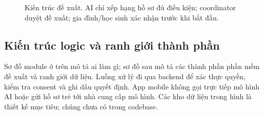 \documentclass[11pt,a4paper]{article}
\begin{document}
\begin{figure}[ht]
{%
}
\caption{Kiến trúc đề xuất. AI chỉ xếp hạng hồ sơ đủ điều kiện; coordinator
duyệt đề xuất; gia đình/học sinh xác nhận trước khi bắt đầu.}
\label{fig:modules}
\end{figure}

\clearpage
\subsection{Kiến trúc logic và ranh giới thành phần}

Sơ đồ module ở trên mô tả ai làm gì; sơ đồ sau mô tả các thành phần phần mềm
đề xuất và ranh giới dữ liệu. Luồng xử lý đi qua backend để xác thực quyền,
kiểm tra consent và ghi dấu quyết định. App mobile không gọi trực tiếp mô hình
AI hoặc gửi hồ sơ trẻ tới nhà cung cấp mô hình. Các kho dữ liệu trong hình là
thiết kế mục tiêu; chúng chưa có trong codebase.
\end{document}
